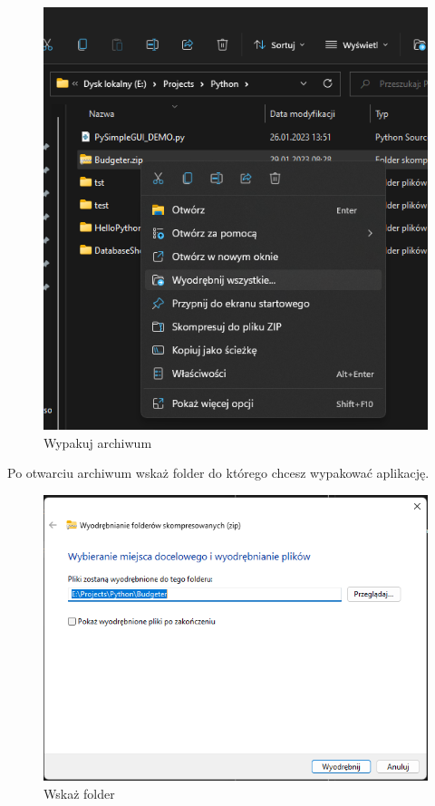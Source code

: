 \documentclass[a4paper,10pt, twoside]{report}
\begin{document}
\begin{figure}[H]           %
    \caption{Wypakuj archiwum}
    \label{fig:Wypakuj archiwum}
    \centering
    \includegraphics[width=12cm]{figures/Guide/Budgeter_Instruction_01_unzip-archive.png}
\end{figure}

{Po otwarciu archiwum wskaż folder do którego chcesz wypakować aplikację.}

\begin{figure}[H]           %
    \caption{Wskaż folder}
    \label{fig:Wskaż folder}
    \centering
    \includegraphics[width=12cm]{figures/Guide/Budgeter_Instruction_01_unzip-archive_p2.png}
\end{figure}
\end{document}

